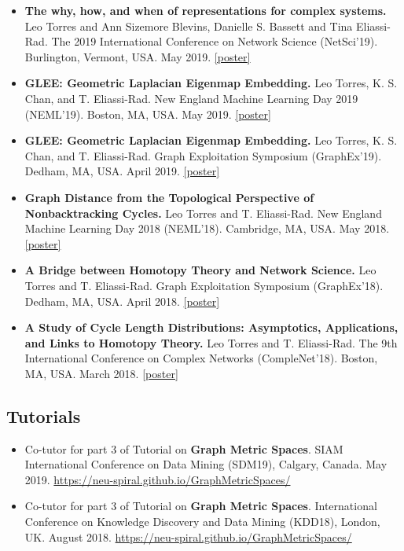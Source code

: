 \documentclass[12pt,]{scrartcl}
\begin{document}
\begin{itemize}
\leftskip-0.25in %

\item \textbf{The why, how, and when of representations for complex systems.} Leo Torres and Ann Sizemore Blevins, Danielle S. Bassett and Tina Eliassi-Rad. The 2019 International Conference on Network Science (NetSci'19). Burlington, Vermont, USA. May 2019. \href{http://leotrs.com/static/hyper_poster.pdf}{[poster]}

\item \textbf{GLEE: Geometric Laplacian Eigenmap Embedding.} Leo Torres, K. S. Chan, and T. Eliassi-Rad. New England Machine Learning Day 2019 (NEML'19). Boston, MA, USA. May 2019. \href{http://leotrs.com/static/glee_poster.pdf}{[poster]}

\item \textbf{GLEE: Geometric Laplacian Eigenmap Embedding.} Leo Torres, K. S. Chan, and T. Eliassi-Rad. Graph Exploitation Symposium (GraphEx'19). Dedham, MA, USA. April 2019. \href{http://leotrs.com/static/glee_poster.pdf}{[poster]}

\item \textbf{Graph Distance from the Topological Perspective of Nonbacktracking Cycles.} Leo Torres and T. Eliassi-Rad. New England Machine Learning Day 2018 (NEML'18). Cambridge, MA, USA. May 2018. \href{http://leotrs.com/static/neml18.pdf}{[poster]}

\item \textbf{A Bridge between Homotopy Theory and Network Science.} Leo Torres and T. Eliassi-Rad. Graph Exploitation Symposium (GraphEx'18). Dedham, MA, USA. April 2018. \href{http://leotrs.com/static/graphex18.pdf}{[poster]}

\item \textbf{A Study of Cycle Length Distributions: Asymptotics, Applications, and Links to Homotopy Theory.} Leo Torres and T. Eliassi-Rad. The 9th International Conference on Complex Networks (CompleNet'18). Boston, MA, USA. March 2018. \href{http://leotrs.com/static/complenet18.pdf}{[poster]}

\end{itemize}


\subsection{Tutorials}\label{tutorials}

\begin{itemize}
\leftskip-0.25in

\item Co-tutor for part 3 of Tutorial on \textbf{Graph Metric Spaces}. SIAM International Conference on Data Mining (SDM19), Calgary, Canada. May 2019. \url{https://neu-spiral.github.io/GraphMetricSpaces/}

\item Co-tutor for part 3 of Tutorial on \textbf{Graph Metric Spaces}. International Conference on Knowledge Discovery and Data Mining (KDD18), London, UK. August 2018. \url{https://neu-spiral.github.io/GraphMetricSpaces/}

\end{itemize}
\end{document}
